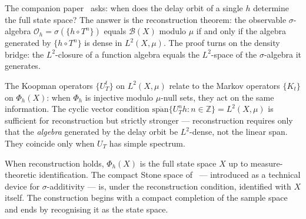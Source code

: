 The companion paper~\cite{mahon_paper3} asks: when does the delay orbit of a
single $h$ determine the full state space?  The answer is the reconstruction
theorem: the observable $\sigma$-algebra $\mathcal{O}_h = \sigma(\{h \circ T^n\})$
equals $\mathcal{B}(X)$ modulo $\mu$ if and only if the algebra generated by
$\{h \circ T^n\}$ is dense in $L^2(X, \mu)$.  The proof turns on the density
bridge: the $L^2$-closure of a function algebra equals the $L^2$-space of the
$\sigma$-algebra it generates.

The Koopman operators $\{U_T^t\}$ on $L^2(X, \mu)$ relate to the Markov
operators $\{K_t\}$ on $\Phi_h(X)$: when $\Phi_h$ is injective modulo
$\mu$-null sets, they act on the same information.  The cyclic vector condition
$\overline{\mathrm{span}}\{U_T^n h : n \in \mathbb{Z}\} = L^2(X, \mu)$ is
sufficient for reconstruction but strictly stronger — reconstruction requires
only that the \emph{algebra} generated by the delay orbit be $L^2$-dense, not
the linear span.  They coincide only when $U_T$ has simple spectrum.

When reconstruction holds, $\Phi_h(X)$ is the full state space $X$ up to
measure-theoretic identification.  The compact Stone space of~\cite{mahon_paper1}
— introduced as a technical device for $\sigma$-additivity — is, under the
reconstruction condition, identified with $X$ itself.  The construction begins
with a compact completion of the sample space and ends by recognising it as the
state space.



